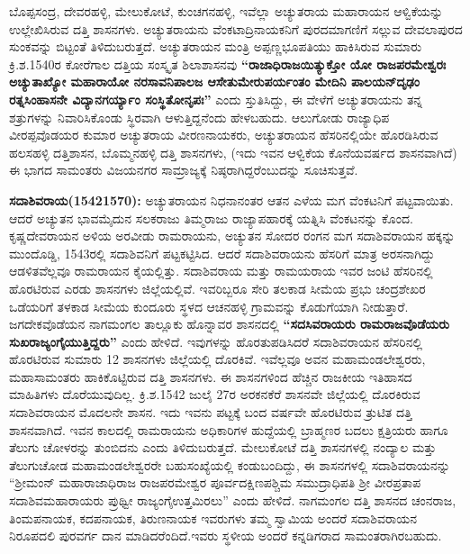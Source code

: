 ಬೊಪ್ಪಸಂದ್ರ, ದೇವರಹಳ್ಳಿ, ಮೇಲುಕೋಟೆ, ಕುಂಚಗನಹಳ್ಳಿ, ಇವೆಲ್ಲಾ ಅಚ್ಯುತರಾಯ ಮಹಾರಾಯನ ಆಳ್ವಿಕೆಯನ್ನು ಉಲ್ಲೇಖಿಸಿರುವ ದತ್ತಿ ಶಾಸನಗಳು. ಅಚ್ಯುತರಾಯನು ವೆಂಕಟಾದ್ರಿನಾಯಕನಿಗೆ ಪುರದಮಾಗಣಿಗೆ ಸಲ್ಲುವ ದೇವಲಾಪುರದ ಸುಂಕವನ್ನು ಬಿಟ್ಟಂತೆ ತಿಳಿದುಬರುತ್ತದೆ. ಅಚ್ಯುತರಾಯನ ಮಂತ್ರಿ ಅಪ್ಪಣ್ಣಭೂಪತಿಯು ಹಾಕಿಸಿರುವ ಸುಮಾರು ಕ್ರಿ.ಶ.1540ರ ಕೋರೆಗಾಲ ದತ್ತಿಯ ಸಂಸ್ಕೃತ ಶಿಲಾಶಾಸನವು \textbf{“ರಾಜಾಧಿರಾಜಯಿತ್ಯುಕ್ತೋ ಯೋ ರಾಜಪರಮೇಶ್ವರಃ ಅಚ್ಯುತಾಖ್ಯೋ ಮಹಾರಾಯೋ ನರಸಾವನಿಪಾಲಜ ಆಸೇತುಮೇರುಪರ್ಯಂತಂ ಮೇದಿನಿ ಪಾಲಯನ್​ ದೃಢಂ ರತ್ನಸಿಂಹಾಸನೇ ವಿದ್ಯಾನಗರ್ಯ್ಯಾಂ ಸಂಸ್ಥಿತೋನೃಪಃ” }ಎಂದು ಸ್ತುತಿಸಿದ್ದು, ಈ ವೇಳೆಗೆ ಅಚ್ಯುತರಾಯನು ತನ್ನ ಶತ್ರುಗಳನ್ನು ನಿವಾರಿಸಿಕೊಂಡು ಸ್ಥಿರವಾಗಿ ಆಳುತ್ತಿದ್ದನೆಂದು ಹೇಳಬಹುದು. ಆಲುಗೋಡು ರಾಜ್ಯಾಧಿಪ ವೀರಪ್ಪವೊಡಯರ ಕುಮಾರ ಅಚ್ಯುತರಾಯ ವೀರಣನಾಯಕರು, ಅಚ್ಯುತರಾಯನ ಹೆಸರಿನಲ್ಲಿಯೇ ಹೊರಡಿಸಿರುವ ಹಲಸಹಳ್ಳಿ ದತ್ತಿಶಾಸನ, ಬೊಮ್ಮನಹಳ್ಳಿ ದತ್ತಿ ಶಾಸನಗಳು, (ಇದು ಇವನ ಆಳ್ವಿಕೆಯ ಕೊನೆಯವರ್ಷದ ಶಾಸನವಾಗಿದೆ) ಈ ಭಾಗದ ಸಾಮಂತರು ವಿಜಯನಗರ ಸಾಮ್ರಾಜ್ಯಕ್ಕೆ ನಿಷ್ಠರಾಗಿದ್ದರೆಂಬುದನ್ನು ಸೂಚಿಸುತ್ತವೆ. 

\textbf{ಸದಾಶಿವರಾಯ(15421570):} ಅಚ್ಯುತರಾಯನ ನಿಧನಾನಂತರ ಆತನ ಎಳೆಯ ಮಗ ವೆಂಕಟನಿಗೆ ಪಟ್ಟವಾಯಿತು. ಆದರೆ ಅಚ್ಯುತನ ಭಾವಮೈದುನ ಸಲಕರಾಜು ತಿಮ್ಮರಾಜು ರಾಜ್ಯಾಪಹಾರಕ್ಕೆ ಯತ್ನಿಸಿ ವೆಂಕಟನನ್ನು ಕೊಂದ. ಕೃಷ್ಣದೇವರಾಯನ ಅಳಿಯ ಅರವೀಡು ರಾಮರಾಯನು, ಅಚ್ಯುತನ ಸೋದರ ರಂಗನ ಮಗ ಸದಾಶಿವರಾಯನ ಹಕ್ಕನ್ನು ಮುಂದೊಡ್ಡಿ, 1543ರಲ್ಲಿ ಸದಾಶಿವನಿಗೆ ಪಟ್ಟಕಟ್ಟಿಸಿದ. ಆದರೆ ಸದಾಶಿವರಾಯನು ಹೆಸರಿಗೆ ಮಾತ್ರ ಅರಸನಾಗಿದ್ದು ಆಡಳಿತವೆಲ್ಲವೂ ರಾಮರಾಯನ ಕೈಯಲ್ಲಿತ್ತು. ಸದಾಶಿವರಾಯ ಮತ್ತು ರಾಮಯರಾಯ ಇವರ ಜಂಟಿ ಹೆಸರಿನಲ್ಲಿ ಹೊರಟಿರುವ ಎರಡು ಶಾಸನಗಳು ಜಿಲ್ಲೆಯಲ್ಲಿವೆ. ಇವರಿಬ್ಬರೂ ಸೇರಿ ತಲಕಾಡ ಸೀಮೆಯ ಪ್ರಭು ಚಂದ್ರಶೇಖರ ಒಡೆಯರಿಗೆ ತಳಕಾಡ ಸೀಮೆಯ ಕುಂದೂರು ಸ್ಥಳದ ಆಚನಹಳ್ಳಿ ಗ್ರಾಮವನ್ನು ಕೊಡುಗೆಯಾಗಿ ನೀಡುತ್ತಾರೆ. ಜಗದೇಕವೊಡೆಯನ ನಾಗಮಂಗಲ ತಾಲ್ಲೂಕು ಹೊನ್ನಾವರ ಶಾಸನದಲ್ಲಿ \textbf{“ಸದಸಿವರಾಯರು ರಾಮರಾಜವೊಡೆಯರು ಸುಖರಾಜ್ಯಂಗೈಯುತ್ತಿದ್ದರು” }ಎಂದು ಹೇಳಿದೆ. ಇವುಗಳನ್ನು ಹೊರತುಪಡಿಸಿದರೆ ಸದಾಶಿವರಾಯನ ಹೆಸರಿನಲ್ಲಿ ಹೊರಟಿರುವ ಸುಮಾರು 12 ಶಾಸನಗಳು ಜಿಲ್ಲೆಯಲ್ಲಿ ದೊರಕಿವೆ. ಇವೆಲ್ಲವೂ ಅವನ ಮಹಾಮಂಡಲೇಶ್ವರರು, ಮಹಾಸಾಮಂತರು ಹಾಕಿಕೊಟ್ಟಿರುವ ದತ್ತಿ ಶಾಸನಗಳು. ಈ ಶಾಸನಗಳಿಂದ ಹೆಚ್ಚಿನ ರಾಜಕೀಯ ಇತಿಹಾಸದ ಮಾಹಿತಿಗಳು ದೊರೆಯುವುದಿಲ್ಲ. ಕ್ರಿ.ಶ.1542 ಜುಲೈ 27ರ ಅರಕನಕೆರೆ ಶಾಸನವೇ ಜಿಲ್ಲೆಯಲ್ಲಿ ದೊರಕಿರುವ ಸದಾಶಿವರಾಯನ ಮೊದಲನೇ ಶಾಸನ. ಇದು ಇವನು ಪಟ್ಟಕ್ಕೆ ಬಂದ ವರ್ಷವೇ ಹೊರಟಿರುವ ತ್ರುಟಿತ ದತ್ತಿ ಶಾಸನವಾಗಿದೆ. ಇವನ ಕಾಲದಲ್ಲಿ ರಾಮರಾಯನು ಅಧಿಕಾರಿಗಳ ಹುದ್ದೆಯಲ್ಲಿ ಬ್ರಾಹ್ಮಣರ ಬದಲು ಕ್ಷತ್ರಿಯರು ಹಾಗೂ ತೆಲುಗು ಚೋಳರನ್ನು ತುಂಬಿದನು ಎಂದು ತಿಳಿದುಬರುತ್ತದೆ. ಮೇಲುಕೋಟೆ ದತ್ತಿ ಶಾಸನಗಳಲ್ಲಿ ನಂದ್ಯಾಲ ಮತ್ತು ತೆಲುಗುಚೋಡ ಮಹಾಮಂಡಲೇಶ್ವರರೇ ಬಹುಸಂಖ್ಯೆಯಲ್ಲಿ ಕಂಡುಬಂದಿದ್ದು, ಈ ಶಾಸನಗಳಲ್ಲಿ ಸದಾಶಿವರಾಯನನ್ನು “ಶ‍್ರೀಮಂನ್​ ಮಹಾರಾಜಾಧಿರಾಜ ರಾಜಪರಮೇಶ್ವರ ಪೂರ್ವದಕ್ಷಿಣಪಶ್ಚಿಮ ಸಮುದ್ರಾಧಿಪತಿ ಶ‍್ರೀ ವೀರಪ್ರತಾಪ ಸದಾಶಿವಮಹಾರಾಯರು ಪ್ರುಥ್ವೀ ರಾಜ್ಯಂಗೈಉತ್ತಮಿರಲು” ಎಂದು ಹೇಳಿದೆ. ನಾಗಮಂಗಲ ದತ್ತಿ ಶಾಸನದ ಚಂನರಾಜ, ತಿಂಮಪನಾಯಕ, ಕದಪನಾಯಕ, ತಿರುಣನಾಯಕ ಇವರುಗಳು ತಮ್ಮ ಸ್ವಾಮಿಯ ಅಂದರೆ ಸದಾಶಿವರಾಯನ ನಿರೂಪದಲಿ ಪುರವರ್ಗ ದಾನ ಮಾಡಿದರೆಂದಿದೆ.ಇವರು ಸ್ಥಳೀಯ ಅಂದರೆ ಕನ್ನಡಿಗರಾದ ಸಾಮಂತರಾಗಿರಬಹುದು. 

